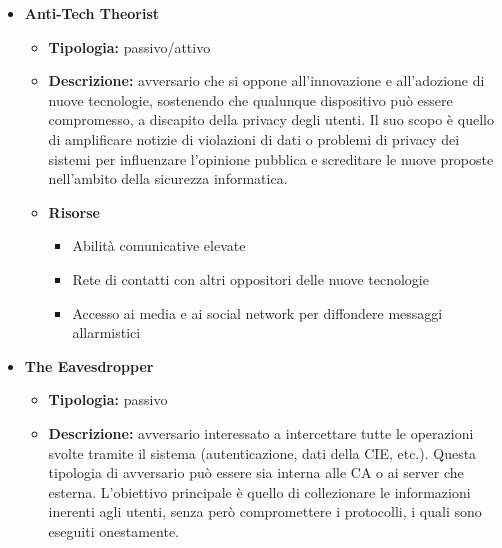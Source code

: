         \begin{itemize}
            \item \textbf{Anti-Tech Theorist}
                \begin{itemize}
                    \item \textbf{Tipologia:} passivo/attivo
                    
                    \item \textbf{Descrizione:} avversario che si oppone all’innovazione e all'adozione di nuove tecnologie, sostenendo che qualunque dispositivo può essere compromesso, a discapito della privacy degli utenti.
                    Il suo scopo è quello di amplificare notizie di violazioni di dati o problemi di privacy dei sistemi per influenzare l’opinione pubblica e screditare le nuove proposte nell'ambito della sicurezza informatica.
                   
                    \item \textbf{Risorse}
                        \begin{itemize}
                            \item Abilità comunicative elevate
    
                            \item Rete di contatti con altri oppositori delle nuove tecnologie
    
                            \item Accesso ai media e ai social network per diffondere messaggi allarmistici
                        \end{itemize}
                \end{itemize}
    
            \item \textbf{The Eavesdropper}
                \begin{itemize}
                    \item \textbf{Tipologia:} passivo
                    
                    \item \textbf{Descrizione:} avversario interessato a intercettare tutte le operazioni svolte tramite il sistema (autenticazione, dati della CIE, etc.).
                    Questa tipologia di avversario può essere sia interna alle CA o ai server che esterna.
                    L'obiettivo principale è quello di collezionare le informazioni inerenti agli utenti, senza però compromettere i protocolli, i quali sono eseguiti onestamente.
                    

\end{itemize}
\end{itemize}
